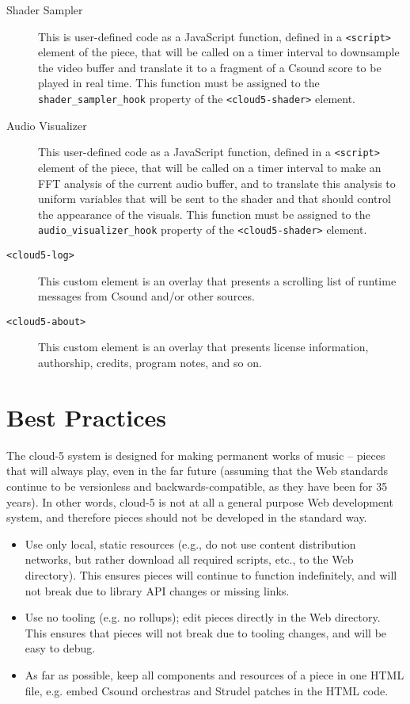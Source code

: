 \documentclass[runningheads,a4paper]{llncs}
\begin{document}
\begin{description}
\item[Shader Sampler] This is user-defined code as a JavaScript function, defined in a \texttt{<script>} element of the piece, that will be called on a timer interval to downsample the video buffer and translate it to a fragment of a Csound score to be played in real time. This function must be assigned to the \texttt{shader\_sampler\_hook} property of the \texttt{<cloud5-shader>} element.
\item[Audio Visualizer] This user-defined code as a JavaScript function, defined in a \texttt{<script>} element of the piece, that will be called on a timer interval to make an FFT analysis of the current audio buffer, and to translate this analysis to uniform variables that will be sent to the shader and that should control the appearance of the visuals. This function must be assigned to the \texttt{audio\_visualizer\_hook} property of the \texttt{<cloud5-shader>} element.
\item[\texttt{<cloud5-log>}] This custom element is an overlay that presents a scrolling list of runtime messages from Csound and/or other sources.
\item[\texttt{<cloud5-about>}] This custom element is an overlay that presents license information, authorship, credits, program notes, and so on.
\end{description}

\section{Best Practices}

The cloud-5 system is designed for making permanent works of music -- pieces that will always play, even in the far future (assuming that the Web standards continue to be versionless and backwards-compatible, as they have been for 35 years). In other words, cloud-5 is not at all a general purpose Web development system, and therefore pieces should not be developed in the standard way.

\begin{itemize}
\item Use only local, static resources (e.g., do not use content distribution networks, but rather download all required scripts, etc., to the Web directory). This ensures pieces will continue to function indefinitely, and will not break due to library API changes or missing links.
\item Use no tooling (e.g. no rollups); edit pieces directly in the Web directory. This ensures that pieces will not break due to tooling changes, and will be easy to debug.
\item As far as possible, keep all components and resources of a piece in one HTML file, e.g. embed Csound orchestras and Strudel patches in the HTML code.
\end{itemize}
\end{document}
